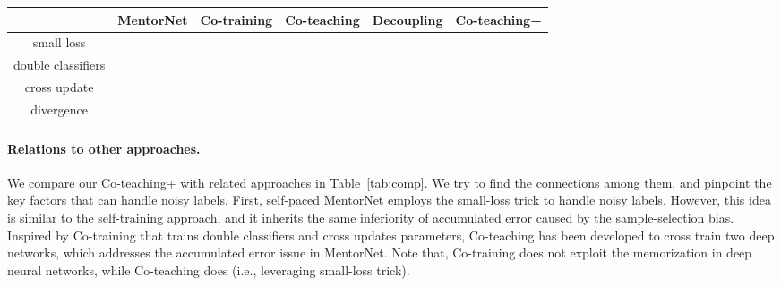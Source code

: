 \documentclass{article}
\begin{document}
\begin{table*}[!tp]
	\centering
	\caption{Comparison of state-of-the-art and related techniques with our Co-teaching+ approach.
		In the first column,
		``small loss'': regarding small-loss samples as ``clean'' samples, which is based on the memorization effects of deep neural networks;
		``double classifiers'': training two classifiers simultaneously;
		``cross update'': updating parameters in a cross manner instead of a parallel manner;
        ``divergence'': keeping two classifiers diverged during the whole training epochs.
}
	\label{tab:comp}
	\scalebox{1}
	{
		\begin{tabular}{c | c | c | c | c | c }
			\hline
			& MentorNet & Co-training & Co-teaching & Decoupling & Co-teaching+ \\ \hline
			small loss   &                           &                               &                   &                                       &                         \\ \hline
			double classifiers   &                           &                               &                           &                            &                               \\ \hline
			cross update &                       &                               &             &                                &                              \\ \hline

           divergence &                      &                            &                &                            &                              \\ \hline
		\end{tabular}
	}
\end{table*}

\paragraph{Relations to other approaches.}
We compare our Co-teaching+ with related approaches in Table~\ref{tab:comp}. We try to find the connections among them, and pinpoint the key factors that can handle noisy labels. First, self-paced MentorNet \cite{jiang2018mentornet} employs the small-loss trick to handle noisy labels. However, this idea is similar to the self-training approach, and it inherits the same inferiority of accumulated error caused by the sample-selection bias. Inspired by Co-training \cite{blum1998combining} that trains double classifiers and cross updates parameters, Co-teaching \cite{han2018coteaching} has been developed to cross train two deep networks, which addresses the accumulated error issue in MentorNet. Note that, Co-training does not exploit the memorization in deep neural networks, while Co-teaching does (i.e., leveraging small-loss trick).
\end{document}
